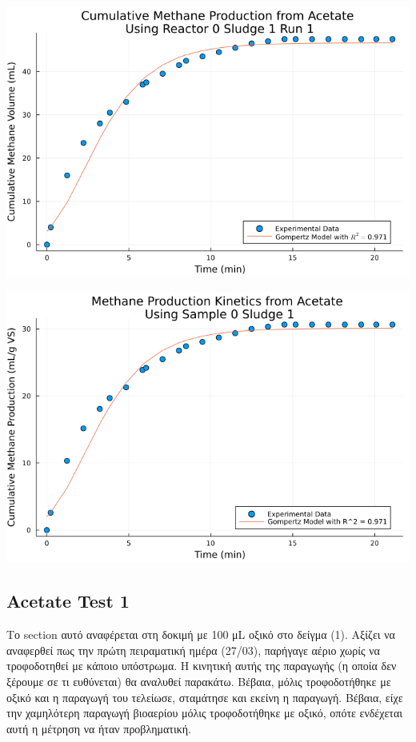 \documentclass[11pt]{article}
\begin{document}
\begin{center}
\includegraphics[width=.9\linewidth]{../plots/BMPs/Acetate/methane_kinetics_acet_test_0_s1_min.png}
\end{center}

\begin{center}
\includegraphics[width=.9\linewidth]{../plots/BMPs/Acetate/specific_methane_kinetics_acet_test_0_s1.png}
\end{center}

\subsection{Acetate Test 1}
\label{sec:org4b95f4f}
Το section αυτό αναφέρεται στη δοκιμή με 100 μL οξικό στο δείγμα (1). Aξίζει να αναφερθεί πως την πρώτη πειραματική ημέρα (27/03), παρήγαγε αέριο χωρίς να τροφοδοτηθεί με κάποιο υπόστρωμα. Η κινητική αυτής της παραγωγής (η οποία δεν ξέρουμε σε τι ευθύνεται) θα αναλυθεί παρακάτω. Βέβαια, μόλις τροφοδοτήθηκε με οξικό και η παραγωγή του τελείωσε, σταμάτησε και εκείνη η παραγωγή. Βέβαια, είχε την χαμηλότερη παραγωγή βιοαερίου μόλις τροφοδοτήθηκε με οξικό, οπότε ενδέχεται αυτή η μέτρηση να ήταν προβληματική.
\end{document}
